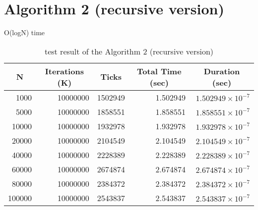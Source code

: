 \section{Algorithm 2 (recursive version)}
O(logN) time
\begin{table}[H]
	\centering
	\caption{test result of the Algorithm 2 (recursive version)}
	\begin{tabular}{|r|r|r|r|r|}
		\hline
		\multicolumn{1}{|c|}{N} &
		\multicolumn{1}{|c|}{Iterations (K)} &
		\multicolumn{1}{|c|}{Ticks} &
		\multicolumn{1}{|c|}{Total Time (sec)} &
		\multicolumn{1}{|c|}{Duration (sec)} \\
		\hline
		1000 & 10000000 & 1502949 & 1.502949 & $1.502949 \times 10 ^ {-7}$ \\
		\hline
		5000 & 10000000 & 1858551 & 1.858551 & $1.858551 \times 10 ^ {-7}$ \\
		\hline
		10000 & 10000000 & 1932978 & 1.932978 & $1.932978 \times 10 ^ {-7}$ \\
		\hline
		20000 & 10000000 & 2104549 & 2.104549 & $2.104549 \times 10 ^ {-7}$ \\
		\hline
		40000 & 10000000 & 2228389 & 2.228389 & $2.228389 \times 10 ^ {-7}$ \\
		\hline
		60000 & 10000000 & 2674874 & 2.674874 & $2.674874 \times 10 ^ {-7}$ \\
		\hline
		80000 & 10000000 & 2384372 & 2.384372 & $2.384372 \times 10 ^ {-7}$ \\
		\hline
		100000 & 10000000 & 2543837 & 2.543837 & $2.543837 \times 10 ^ {-7}$ \\
		\hline
	\end{tabular}
\end{table}

